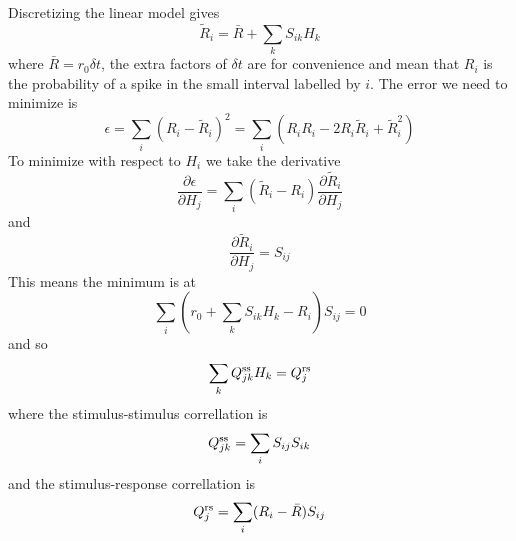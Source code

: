 \documentclass[12pt]{article}
\begin{document}
\begin{enumerate}
Discretizing the linear model gives
\begin{equation}
\tilde{R}_i=\bar{R}+\sum_k S_{ik}H_k
\end{equation}
where $\bar{R}=r_0\delta t$, the extra factors of $\delta t$ are for
convenience and mean that $R_i$ is the probability of a spike in the
small interval labelled by $i$. The error we need to minimize is
\begin{equation}
\epsilon=\sum_i(R_i-\tilde{R}_i)^2=\sum_i\left(R_iR_i-2R_i\tilde{R}_i+\tilde{R}_i^2\right)
\end{equation}
To minimize with respect to $H_i$ we take the derivative
\begin{equation}
\frac{\partial\epsilon}{\partial H_j}=\sum_i(\tilde{R}_i-R_i)\frac{\partial\tilde{R}_i}{\partial H_j}
\end{equation}
and
\begin{equation}
\frac{\partial\tilde{R}_i}{\partial H_j}=S_{ij}
\end{equation}
This means the minimum is at
\begin{equation}
\sum_i\left(r_0+\sum_k S_{ik}H_k-R_i\right)S_{ij}=0
\end{equation}
and so
\begin{equation}
\sum_k Q^{\mbox{\scriptsize{ss}}}_{jk} H_k=Q^{\mbox{\scriptsize{rs}}}_j
\end{equation}
where the stimulus-stimulus correllation is
\begin{equation}
Q^{\mbox{\scriptsize{ss}}}_{jk}=\sum_i S_{ij}S_{ik}
\end{equation}
and the stimulus-response correllation is
\begin{equation}
Q^{\mbox{\scriptsize{rs}}}_j=\sum_i (R_i-\bar{R})S_{ij}
\end{equation}



\end{enumerate}
\end{document}
